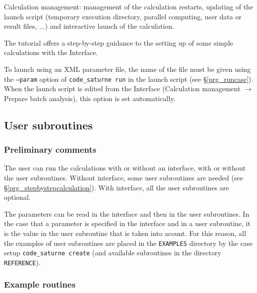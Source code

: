 {{{\begin{list}{-}{}
\item Calculation management: management of the calculation restarts,
      updating of the launch script (temporary execution directory, parallel
      computing, user data or result files, ...) and interactive launch of the
      calculation.

\end{list}

The \CS tutorial \cite{tutorial} offers a step-by-step guidance to the setting
up of some simple calculations with the \CS Interface.

To launch \CS using an XML parameter file,
the name of the file must
be given using the \texttt{--param} option of \texttt{code\_saturne run} in
the launch script (see \S\ref{prg_runcase}). When the launch
script is edited from the Interface (Calculation management $\rightarrow$
Prepare batch analysis), this option is set automatically.

\subsection{User subroutines}
\label{prg_ssprgutilis}
\subsubsection{Preliminary comments}

The user can run the calculations with or without an interface, with or
 without the user subroutines. Without interface, some user subroutines
 are needed (see \S\ref{prg_stepbystepcalculation}). With interface, 
all the user subroutines are optional.

The parameters can be read in the interface and then in the user
subroutines. In the case that a parameter is specified in the interface
 and in a user subroutine, it is the value in the user subroutine that
 is taken into acount. For this reason, all the examples of
 user subroutines are placed in the \texttt{EXAMPLES} directory by the
 case setup \texttt{code\_saturne~create} (and available subroutines in the 
 directory \texttt{REFERENCE}).

\subsubsection{Example routines}

}}}
